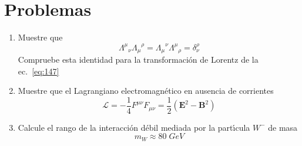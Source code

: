 \section{Problemas}
\label{sec:problemas2}
\renewcommand{\labelenumi}{\thechapter.\theenumi} %

\begin{enumerate} %
\item Muestre que
  \begin{equation*}
    {\Lambda^{\mu}}_{\nu}{\Lambda_\mu}^{\rho}={\Lambda_{\mu}}^{\nu}{\Lambda^{\mu}}_{\rho}=\delta^\rho_\nu
  \end{equation*}
Compruebe esta identidad para la transformaci\'on de Lorentz de la ec.~\eqref{eq:147}
\label{item:pch2.1} %

\item Muestre que el Lagrangiano electromagn\'etico en ausencia de corrientes
  \begin{equation}
    \mathcal{L}=-\frac{1}{4}F^{\mu\nu}F_{\mu\nu}=\frac{1}{2}\left(\mathbf{E}^2-\mathbf{B}^2\right)
  \end{equation}
\label{item:pch2.2} %

\item Calcule el rango de la interacci\'on d\'ebil mediada por la part\'\i cula $W^{-}$ de masa
  \begin{equation}
    m_W\approx80\;GeV
  \end{equation}
\label{item:pch2.3} %
\end{enumerate} %
\renewcommand{\labelenumi}{\theenumi} %







